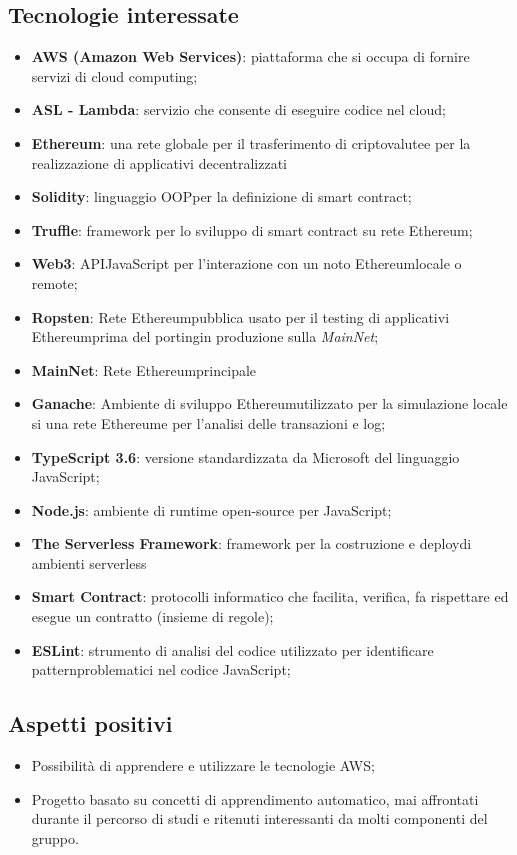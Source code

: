 \subsection{Tecnologie interessate}
\begin{itemize}
	\item \textbf{AWS (Amazon Web Services)}: piattaforma che si occupa di fornire servizi di cloud computing\glo;
	\item \textbf{ASL - Lambda}: servizio che consente di eseguire codice nel cloud;
	\item \textbf{Ethereum}: una rete globale per il trasferimento di criptovalute\glo e per la realizzazione di applicativi decentralizzati
	\item \textbf{Solidity}: linguaggio OOP\glo per la definizione di smart contract\glo;
	\item \textbf{Truffle}: framework per lo sviluppo di smart contract su rete Ethereum\glo;
	\item \textbf{Web3}: API\glo JavaScript per l'interazione con un noto Ethereum\glo locale o remote;
	\item \textbf{Ropsten}: Rete Ethereum\glo pubblica usato per il testing di applicativi Ethereum\glo prima del porting\glo in produzione sulla \textit{MainNet};
	\item \textbf{MainNet}: Rete Ethereum\glo principale
	\item \textbf{Ganache}: Ambiente di sviluppo Ethereum\glo utilizzato per la simulazione locale si una rete Ethereum\glo e per l'analisi delle transazioni e log;
	\item \textbf{TypeScript 3.6}: versione standardizzata da Microsoft del linguaggio JavaScript;
	\item \textbf{Node.js}: ambiente di runtime open-source per JavaScript;
	\item \textbf{The Serverless Framework}: framework per la costruzione e deploy\glo di ambienti serverless\glo
	\item \textbf{Smart Contract}: protocolli informatico che facilita, verifica, fa rispettare ed esegue un contratto (insieme di regole);
	\item \textbf{ESLint}: strumento di analisi del codice utilizzato per identificare pattern\glo problematici nel codice JavaScript;
\end{itemize}

\subsection{Aspetti positivi}
\begin{itemize}
	\item Possibilità di apprendere e utilizzare le tecnologie AWS;
	\item Progetto basato su concetti di apprendimento automatico\glos, mai affrontati durante il percorso di studi e ritenuti interessanti da molti componenti del gruppo.
\end{itemize}

